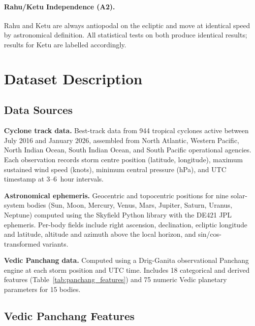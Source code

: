 \documentclass[12pt,a4paper]{article}
\begin{document}
\paragraph{Rahu/Ketu Independence (A2).} Rahu and Ketu are always
antiopodal on the ecliptic and move at identical speed by astronomical
definition. All statistical tests on both produce identical results; results
for Ketu are labelled accordingly.

\section{Dataset Description}
\label{sec:data}

\subsection{Data Sources}

\textbf{Cyclone track data.} Best-track data from 944 tropical cyclones
active between July 2016 and January 2026, assembled from North Atlantic,
Western Pacific, North Indian Ocean, South Indian Ocean, and South Pacific
operational agencies. Each observation records storm centre position (latitude,
longitude), maximum sustained wind speed (knots), minimum central pressure
(hPa), and UTC timestamp at 3--6~hour intervals.

\textbf{Astronomical ephemeris.} Geocentric and topocentric positions for
nine solar-system bodies (Sun, Moon, Mercury, Venus, Mars, Jupiter, Saturn,
Uranus, Neptune) computed using the Skyfield Python library \cite{skyfield2019}
with the DE421 JPL ephemeris. Per-body fields include right ascension,
declination, ecliptic longitude and latitude, altitude and azimuth above the
local horizon, and sin/cos-transformed variants.

\textbf{Vedic Panchang data.} Computed using a Drig-Ganita observational
Panchang engine at each storm position and UTC time. Includes 18 categorical
and derived features (Table~\ref{tab:panchang_features}) and 75 numeric Vedic
planetary parameters for 15 bodies.

\subsection{Vedic Panchang Features}
\end{document}
